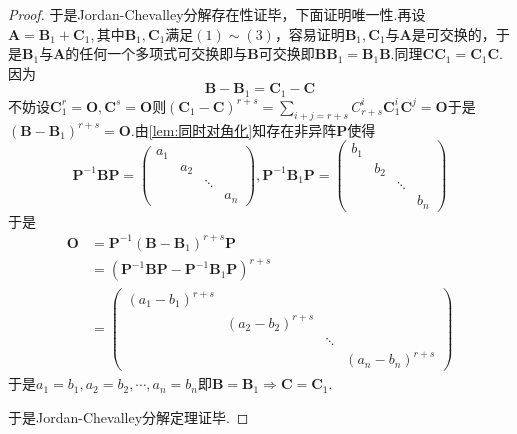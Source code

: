 {\begin{proof}
        于是Jordan-Chevalley分解存在性证毕，下面证明唯一性.再设$\bm{A}=\bm{B}_1+\bm{C}_1,$其中$\bm{B}_1,\bm{C}_1$满足$(1)\sim (3)$，容易证明$\bm{B}_1,\bm{C}_1$与$\bm{A}$是可交换的，于是$\bm{B}_1$与$\bm{A}$的任何一个多项式可交换即与$\bm{B}$可交换即$\bm{BB}_1=\bm{B}_1\bm{B}$.同理$\bm{CC}_1=\bm{C}_1\bm{C}$.因为\[
            \bm{B}-\bm{B}_1=\bm{C}_1-\bm{C}
        \]不妨设$\bm{C}_1^r=\bm{O},\bm{C}^s=\bm{O}$则$\displaystyle \left(\bm{C}_1-\bm{C}\right)^{r+s}=\sum_{i+j=r+s}C_{r+s}^i\bm{C}_1^i\bm{C}^j=\bm{O}$于是$\left(
            \bm{B}-\bm{B}_1
            \right)^{r+s}=\bm{O}$.由\cref{lem:同时对角化}知存在非异阵$\bm{P}$使得\[
            \bm{P}^{-1}\bm{BP}=\begin{pmatrix}
                a_1 &     &        &     \\
                    & a_2 &        &     \\
                    &     & \ddots &     \\
                    &     &        & a_n
            \end{pmatrix},\bm{P}^{-1}\bm{B}_1\bm{P}=\begin{pmatrix}
                b_1 &     &        &     \\
                    & b_2 &        &     \\
                    &     & \ddots &     \\
                    &     &        & b_n
            \end{pmatrix}
        \]于是\begin{align*}
            \bm{O} & =\bm{P}^{-1}\left(\bm{B}-\bm{B}_1\right)^{r+s}\bm{P}                                           \\
                   & =\left(
            \bm{P}^{-1}\bm{B}\bm{P}-\bm{P}^{-1}\bm{B}_1\bm{P}
            \right)^{r+s}                                                                                           \\
                   & =\begin{pmatrix}
                          \left(a_1-b_1\right)^{r+s} &                            &        &                            \\
                                                     & \left(a_2-b_2\right)^{r+s} &        &                            \\
                                                     &                            & \ddots &                            \\
                                                     &                            &        & \left(a_n-b_n\right)^{r+s}
                      \end{pmatrix}
        \end{align*}于是$a_1=b_1,a_2=b_2,\cdots,a_n=b_n$即$\bm{B}=\bm{B}_1\Longrightarrow \bm{C}=\bm{C}_1$.

        于是Jordan-Chevalley分解定理证毕.
    \end{proof}
}
